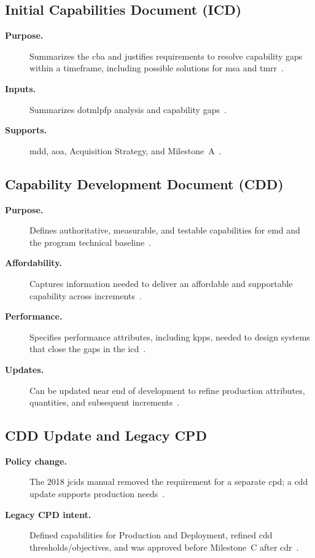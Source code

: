 \documentclass[../main.tex]{subfiles}
\begin{document}
\subsection{Initial Capabilities Document (ICD)}
\begin{description}
  \item[\textbf{Purpose.}] Summarizes the \ac{cba} and justifies requirements to resolve capability gaps within a timeframe, including possible solutions for \ac{msa} and \ac{tmrr}~\autocite{edo-3-3-3-jcids-2025}.
  \item[\textbf{Inputs.}] Summarizes \ac{dotmlpfp} analysis and capability gaps~\autocite{edo-3-3-3-jcids-2025}.
  \item[\textbf{Supports.}] \ac{mdd}, \ac{aoa}, Acquisition Strategy, and Milestone~A~\autocite{edo-3-3-3-jcids-2025}.
\end{description}

\subsection{Capability Development Document (CDD)}
\begin{description}
  \item[\textbf{Purpose.}] Defines authoritative, measurable, and testable capabilities for \ac{emd} and the program technical baseline~\autocite{edo-3-3-3-jcids-2025}.
  \item[\textbf{Affordability.}] Captures information needed to deliver an affordable and supportable capability across increments~\autocite{edo-3-3-3-jcids-2025}.
  \item[\textbf{Performance.}] Specifies performance attributes, including \acp{kpp}, needed to design systems that close the gaps in the \ac{icd}~\autocite{edo-3-3-3-jcids-2025}.
  \item[\textbf{Updates.}] Can be updated near end of development to refine production attributes, quantities, and subsequent increments~\autocite{edo-3-3-3-jcids-2025}.
\end{description}

\subsection{CDD Update and Legacy CPD}
\begin{description}
  \item[\textbf{Policy change.}] The 2018 \ac{jcids} manual removed the requirement for a separate \ac{cpd}; a \ac{cdd} update supports production needs~\autocite{edo-3-3-3-jcids-2025}.
  \item[\textbf{Legacy CPD intent.}] Defined capabilities for Production and Deployment, refined \ac{cdd} thresholds/objectives, and was approved before Milestone~C after \ac{cdr}~\autocite{edo-3-3-3-jcids-2025}.
\end{description}
\end{document}
